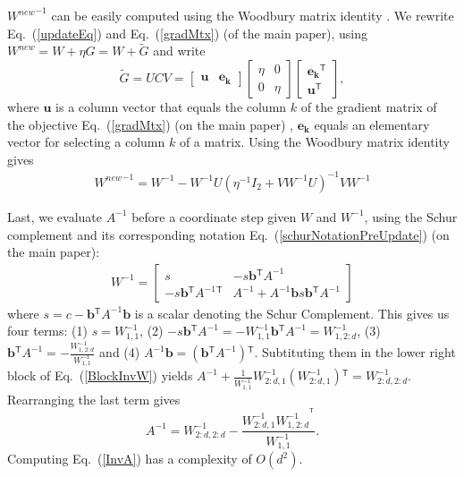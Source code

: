 \documentclass{article} %
\newcommand\mat[1]{{#1}}
\renewcommand\vec[1]{\mathbf{#1}}
\newcommand{\T}{{}^\mathsf{T}}
\newcommand{\W}{\mat{W}}
\newcommand{\newW}{{\mat{W^{new}}}}
\newcommand{\B}{\vec{b}}
\newcommand{\C}{c}
\newcommand{\invA}{A^{-1}}
\renewcommand{\eqref}[1]{Eq.~(\ref{#1})}
\begin{document}
$\newW^{-1}$ can be easily computed using the Woodbury matrix
identity \cite{woodbury1950inverting}. We rewrite \eqref{updateEq} and \eqref{gradMtx} (of the main paper), using $\newW = \W + \eta G = \W+\mat{\widetilde{G}}$
and write
\begin{equation}
  \mat{\widetilde{G}} = \mat{U}\mat{C}\mat{V} = \left[ \begin{matrix}
      \vec{u} & \vec{e_k} \end{matrix} \right] \left[ \begin{matrix}
      \eta & 0 \\ 0 & \eta \end{matrix} \right] \left[ \begin{matrix}
      \vec{e_k}\T \\ \vec{u}\T \end{matrix} \right],
  \label{gradMtxWDB}
  \nonumber 
\end{equation}
where $\vec{u}$ is a column vector that equals the column $k$ of the gradient matrix of the objective \eqref{gradMtx} (on the main paper) ,
$\vec{e_k}$ equals an elementary vector for selecting a column $k$ of
a matrix. 
Using the Woodbury matrix identity gives 
\begin{equation}
    \begin{array}{lcl}
    \newW^{-1} = 
    \W^{-1} - \W^{-1} \mat{U} (\eta^{-1} I_2 + \mat{V}     \W^{-1} \mat{U})^{-1} \mat{V} \W^{-1}
    \end{array}
    \nonumber
    \label{InvWwdb}
\end{equation}

Last, we evaluate $\invA$ before a coordinate step given $\W$
and $\W^{-1}$, using the Schur complement and its corresponding
notation \eqref{schurNotationPreUpdate} (on the main paper):
\begin{equation}
\begin{array}{l}
 \W^{-1} \!\!=\!\! 
 \left[ \begin{array}{cc} s & -s \B\T \invA \\ -s \B\T \invA\T &  \invA \!+ \!\invA \B s \B\T \invA  \end{array}  \right]
\end{array}
\label{BlockInvW}
\end{equation} 
where $s= \C-\B\T \invA \B$ is a scalar denoting the Schur Complement. This gives us four terms: (1) $s = \W^{-1}_{1,1}$, (2)
$  -s \B\T \invA = -\W^{-1}_{1,1} \B\T \invA = \W^{-1}_{1,2:d}$, (3) $\B\T \invA = -\frac{\W^{-1}_{1,2:d}}{\W^{-1}_{1,1} }$ and (4) $\invA\B = (\B\T \invA)\T$. Subtituting them in the lower right block of \eqref{BlockInvW} yields $\invA + \frac{1}{\W^{-1}_{1,1} } \W^{-1}_{2:d,1} (\W^{-1}_{2:d,1})\T = \W^{-1}_{2:d,2:d}$. Rearranging the last term gives
\begin{equation}
  \invA = \W^{-1}_{2:d,2:d}- \frac{\W^{-1}_{2:d,1} {\W^{-1}_{1, 2:d}}^{\T}}{\W^{-1}_{1,1}}. 
  \label{InvA}
\end{equation}
Computing \eqref{InvA} has a complexity of $O(d^2)$.
\end{document}

